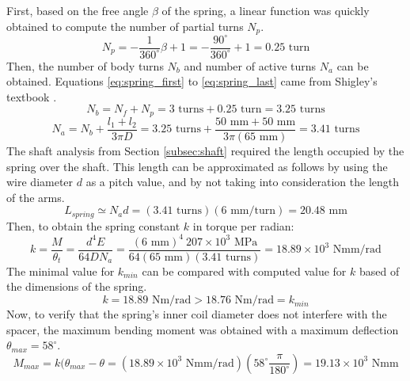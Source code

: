 First, based on the free angle $\beta$ of the spring, a linear function was quickly obtained to compute the number of partial turns $N_p$.
\begin{equation}
    N_p = -\frac{1}{360^{\circ}}\beta + 1 = -\frac{90^{\circ}}{360^{\circ}} + 1 = 0.25\text{ turn}
\end{equation}
Then, the number of body turns $N_b$ and number of active turns $N_a$ can be obtained. Equations \ref{eq:spring_first} to \ref{eq:spring_last} came from Shigley's textbook \cite{budynas_shigleys_2015}. 
\begin{equation}\label{eq:spring_first}
    N_b = N_f + N_p = 3\text{ turns} + 0.25\text{ turn} = 3.25\text{ turns}
\end{equation}
\begin{equation}
    N_a = N_b +\frac{l_1 + l_2}{3\pi D} = 3.25\text{ turns} +\frac{50\text{ mm} + 50\text{ mm}}{3\pi (65\text{ mm})} = 3.41\text{ turns}
\end{equation}
The shaft analysis from Section \ref{subsec:shaft} required the length occupied by the spring over the shaft. This length can be approximated as follows by using the wire diameter $d$ as a pitch value, and by not taking into consideration the length of the arms.
\begin{equation}
    L_{spring} \simeq N_a d = (3.41\text{ turns})(6\text{ mm/turn}) = 20.48\text{ mm}
\end{equation}
Then, to obtain the spring constant $k$ in torque per radian: 
\begin{equation}
    k =\frac{M}{\theta_t} = \frac{d^4 E}{64 D N_a} = \frac{(6\text{ mm})^4\ 207\times 10^3\text{ MPa}}{64 (65\text{ mm})(3.41 \text{ turns})}= 18.89\times 10^3\text{ Nmm/rad}
\end{equation}
The minimal value for $k_{min}$ can be compared with computed value for $k$ based of the dimensions of the spring.
\begin{equation}
    k = 18.89\text{ Nm/rad} > 18.76\text{ Nm/rad} = k_{min} 
\end{equation}
Now, to verify that the spring's inner coil diameter does not interfere with the spacer, the maximum bending moment was obtained with a maximum deflection $\theta_{max} = 58^{\circ}$.
\begin{equation}
    M_{max} = k(\theta_{max}-\theta = (18.89\times 10^3\text{ Nmm/rad})(58^{\circ}\frac{\pi}{180^{\circ}})= 19.13\times 10^3\text{ Nmm}
\end{equation}
